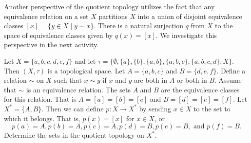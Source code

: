 \begin{comment}

\ActivitySolution
\ba
\item We know that $\emptyset$ and $Y$ are open. We consider all of the remaining subsets of $Y$. Note that 
\begin{align*}
p^{-1}(\{-1\}) &= (-\infty, 0), \\
p^{-1}(\{0\}) &= \{0\}, \\
p^{-1}(\{1\}) &= (0,\infty, 0), \\
p^{-1}(\{-1,0\}) &= (-\infty, 0], \\
p^{-1}(\{-1,1\}) &= (-\infty, 0) \cup (0, \infty), \text{ and } \\
p^{-1}(\{0,1\}) &= [0,\infty).
\end{align*}
The only subsets of $Y$ that have open inverse images are $\{-1\}$, $\{1\}$, and $\{-1,1\}$. So the quotient topology is
\[\{\emptyset, \{-1\}, \{1\}, \{-1,1\}, Y\}.\]

\item The graph shows that for $y$ in $Y$, we have 
\[p^{-1}(y) = \{k+y \mid k \in \Z\}.\]
So $p^{-1}(B) = \{k+b \mid k \in \Z \text{ and } b \in B\}$. The only way for $p^{-1}(B)$ to be open in $X$ is for $p^{-1}(B)$ to be a union of open intervals. This will happen only when $B$ is a union of open intervals in $Y$. Since $p^{-1}((a,b)) = \bigcup_{k \in \Z} (k+a, k+b)$ when $0 \leq a < b < 1$, the quotient topology is 
\[\{\emptyset,Y\} \cup \{(a,b) \mid 0 \leq a < b < 1\}.\]


\ea

\end{comment}

Another perspective of the quotient topology utilizes the fact that any equivalence relation on a set $X$ partitions $X$ into a union of disjoint equivalence classes $[x] = \{y \in X \mid y \sim x\}$. There is a natural surjection $q$ from $X$ to the space of equivalence classes given by $q(x) = [x]$. We investigate this perspective in the next activity.

\begin{activity} \label{act:quotient_er} Let $X = \{a,b,c,d,e,f\}$ and let $\tau = \{\emptyset, \{a\}, \{b\}, \{a, b\}, \{a, b, c\}, \{a, b, c, d\}, X\}$. Then $(X, \tau)$ is a topological space. Let $A = \{a, b, c\}$ and $B = \{d,e,f\}$. Define a relation $\sim$ on $X$ such that $x \sim y$ if $x$ and $y$ are both in $A$ or both in $B$. Assume that $\sim$ is an equivalence relation. The sets $A$ and $B$ are the equivalence classes for this relation. That is $A = [a] = [b] = [c]$ and $B = [d] = [e] = [f]$. Let $X^* = \{A,B\}$. Then we can define $p : X \to X^*$ by sending $x \in X$ to the set to which it belongs. That is, $p(x) = [x]$ for $x \in X$, or 
\[p(a) = A, p(b) = A, p(c) = A, p(d) = B, p(e) = B, \text{ and } p(f) = B.\]
Determine the sets in the quotient topology on $X^*$. 
\end{activity}

